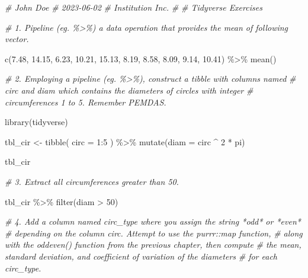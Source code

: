 \documentclass[
]{book}
\newenvironment{Shaded}{\begin{snugshade}}{\end{snugshade}}
\newcommand{\AttributeTok}[1]{\textcolor[rgb]{0.77,0.63,0.00}{#1}}
\newcommand{\CommentTok}[1]{\textcolor[rgb]{0.56,0.35,0.01}{\textit{#1}}}
\newcommand{\DecValTok}[1]{\textcolor[rgb]{0.00,0.00,0.81}{#1}}
\newcommand{\FloatTok}[1]{\textcolor[rgb]{0.00,0.00,0.81}{#1}}
\newcommand{\FunctionTok}[1]{\textcolor[rgb]{0.00,0.00,0.00}{#1}}
\newcommand{\NormalTok}[1]{#1}
\newcommand{\OtherTok}[1]{\textcolor[rgb]{0.56,0.35,0.01}{#1}}
\newcommand{\SpecialCharTok}[1]{\textcolor[rgb]{0.00,0.00,0.00}{#1}}
\begin{document}
\begin{Shaded}
\begin{Highlighting}[]
\CommentTok{\# John Doe}
\CommentTok{\# 2023{-}06{-}02}
\CommentTok{\# Institution Inc.}
\CommentTok{\#}
\CommentTok{\# Tidyverse Exercises}

\CommentTok{\# 1. Pipeline (eg. \textasciigrave{}\%\textgreater{}\%\textasciigrave{}) a data operation that provides the mean of following vector.}

\FunctionTok{c}\NormalTok{(}\FloatTok{7.48}\NormalTok{, }\FloatTok{14.15}\NormalTok{, }\FloatTok{6.23}\NormalTok{, }\FloatTok{10.21}\NormalTok{, }\FloatTok{15.13}\NormalTok{, }\FloatTok{8.19}\NormalTok{, }\FloatTok{8.58}\NormalTok{, }\FloatTok{8.09}\NormalTok{, }\FloatTok{9.14}\NormalTok{, }\FloatTok{10.41}\NormalTok{) }\SpecialCharTok{\%\textgreater{}\%} \FunctionTok{mean}\NormalTok{()}


\CommentTok{\# 2.  Employing a pipeline (eg. \textasciigrave{}\%\textgreater{}\%\textasciigrave{}), construct a tibble with columns named }
\CommentTok{\#     \textasciigrave{}circ\textasciigrave{} and \textasciigrave{}diam\textasciigrave{} which contains the diameters of circles with integer }
\CommentTok{\#     circumferences 1 to 5. Remember PEMDAS.}

\FunctionTok{library}\NormalTok{(tidyverse)}

\NormalTok{tbl\_cir }\OtherTok{\textless{}{-}} \FunctionTok{tibble}\NormalTok{(}
  \AttributeTok{circ =} \DecValTok{1}\SpecialCharTok{:}\DecValTok{5}
\NormalTok{) }\SpecialCharTok{\%\textgreater{}\%}
  \FunctionTok{mutate}\NormalTok{(}\AttributeTok{diam =}\NormalTok{ circ }\SpecialCharTok{\^{}} \DecValTok{2} \SpecialCharTok{*}\NormalTok{ pi)}

\NormalTok{tbl\_cir}


\CommentTok{\# 3.  Extract all circumferences greater than 50.}

\NormalTok{tbl\_cir }\SpecialCharTok{\%\textgreater{}\%} \FunctionTok{filter}\NormalTok{(diam }\SpecialCharTok{\textgreater{}} \DecValTok{50}\NormalTok{)}


\CommentTok{\# 4. Add a column named \textasciigrave{}circ\_type\textasciigrave{} where you assign the string *odd* or *even* }
\CommentTok{\#     depending on the column \textasciigrave{}circ\textasciigrave{}. Attempt to use the \textasciigrave{}purrr::map\textasciigrave{} function, }
\CommentTok{\#     along with the \textasciigrave{}oddeven()\textasciigrave{} function from the previous chapter, then compute }
\CommentTok{\#     the mean, standard deviation, and coefficient of variation of the diameters }
\CommentTok{\#     for each \textasciigrave{}circ\_type\textasciigrave{}.}


\end{Highlighting}
\end{Shaded}
\end{document}

